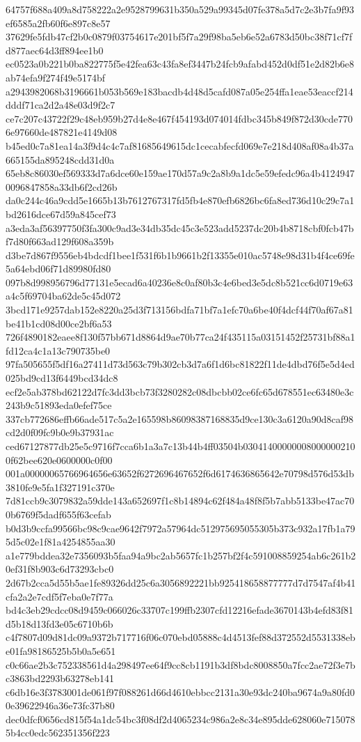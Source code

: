 {64757f688a409a8d758222a2e9528799631b350a529a99345d07fe378a5d7c2e3b7fa9f93ef6585a2fb60f6e897c8e57
37629fe5fdb47cf2b0c0879f03754617e201bf5f7a29f98ba5eb6e52a6783d50bc38f71cf7fd877aec64d3ff894ee1b0
ec0523a0b221b0ba822775f5e42fea63c43fa8ef3447b24fcb9afabd452d0df51e2d82b6e8ab74efa9f274f49e5174bf
a2943982068b3196661b053b569e183bacdb4d48d5cafd087a05e254ffa1eae53eaccf214dddf71ca2d2a48e03d9f2c7
ce7c207c43722f29c48eb959b27d4e8e467f454193d074014fdbc345b849f872d30cde7706e97660de487821e4149d08
b45ed0c7a81ea14a3f9d4c4c7af81685649615dc1cecabfecfd069e7e218d408af08a4b37a665155da895248cdd31d0a
65eb8c86030ef569333d7a6dce60e159ae170d57a9c2a8b9a1dc5e59efedc96a4b41249470096847858a33db6f2cd26b
da0c244c46a9cdd5e1665b13b7612767317fd5fb4e870efb6826bc6fa8ed736d10c29c7a1bd2616dce67d59a845cef73
a3eda3af56397750f3fa300c9ad3e34db35dc45c3e523add5237dc20b4b8718cbf0fcb47bf7d80f663ad129f608a359b
d3be7d867f9556eb4bdcdf1bee1f531f6b1b9661b2f13355e010ac5748e98d31b4f4ce69fe5a64ebd06f71d89980fd80
097b8d998956796d77131e5ecad6a40236e8c0af80b3c4e6bed3e5dc8b521cc6d0719e63a4c5f69704ba62de5c45d072
3bcd171e9257dab152e8220a25d3f713156bdfa71bf7a1efc70a6be40f4dcf44f70af67a81be41b1cd08d00ce2bf6a53
726f4890182eaee8f130f57bb671d8864d9ae70b77ca24f435115a03151452f25731bf88a1fd12ca4c1a13c790735be0
97fa505655f5df16a27411d73d563c79b302cb3d7a6f1d6bc81822f11de4dbd76f5e5d4ed025bd9cd13f6449bcd34dc8
ecf2e5ab378bd62122d7fc3dd3bcb73f3280282c08dbcbb02ce6fc65d678551ec63480e3c243b9c51893eda0efef75ce
337cb772686effb66ade517c5a2e165598b86098387168835d9ce130c3a6120a90d8caf98cd2d0f09fc9b0e9b37931ac
ced67127877db25e5c9716f7cca6b1a3a7c13b44b4ff03504b030414000000080000002100f62bee620e0600000c0f00
001a00000065766964656e63652f6272696467652f6d6174636865642e70798d576d53db3810fe9e5fa1f327191c370e
7d81ccb9c3079832a59dde143a652697f1c8b14894c62f484a48f8f5b7abb5133be47ac700b6769f5dadf655f63cefab
b0d3b9ccfa99566bc98c9cae9642f7972a57964dc512975695055305b373c932a17fb1a795d5c02e1f81a4254855aa30
a1e779bddea32e7356093b5faa94a9bc2ab5657fc1b257bf2f4c591008859254ab6c261b20ef31f8b903c6d73293cbc0
2d67b2cca5d55b5ae1fe89326dd25c6a3056892221bb925418658877777d7d7547af4b41cfa2a2e7cdf5f7eba0e7f77a
bd4c3eb29cdcc08d9459c066026c33707c199ffb2307cfd12216efade3670143b4efd83f81d5b18d13fd3e05c6710b6b
c4f7807d09d81dc09a9372b717716f06c070ebd05888c4d4513fef88d372552d5531338ebe01fa98186525b5b0a5e651
c0c66ae2b3c752338561d4a298497ee64f9cc8cb1191b3df8bdc8008850a7fcc2ae72f3e7bc3863bd2293b63278eb141
c6db16e3f3783001de061f97f088261d66d4610ebbcc2131a30e93dc240ba9674a9a80fd00e39622946a36e73fc37b80
dec0dfcf0656cd815f54a1dc54bc3f08df2d4065234c986a2e8c34e895dde628060e7150785b4cc0edc562351356f223
}
